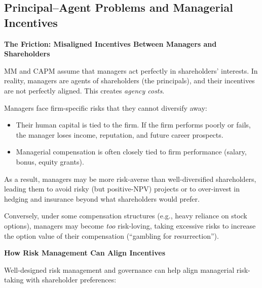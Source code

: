 \documentclass[11pt,openany]{book}
\providecommand{\tightlist}{\setlength{\itemsep}{0pt}\setlength{\parskip}{0pt}}
\begin{document}
\subsection{Principal--Agent Problems and Managerial Incentives}\label{principalagent-problems-and-managerial-incentives}

\textbf{The Friction: Misaligned Incentives Between Managers and Shareholders}

MM and CAPM assume that managers act perfectly in shareholders' interests. In reality, managers are agents of shareholders (the principals), and their incentives are not perfectly aligned. This creates \emph{agency costs}.

Managers face firm-specific risks that they cannot diversify away:

\begin{itemize}
\tightlist
\item
  Their human capital is tied to the firm. If the firm performs poorly or fails, the manager loses income, reputation, and future career prospects.
\item
  Managerial compensation is often closely tied to firm performance (salary, bonus, equity grants).
\end{itemize}

As a result, managers may be more risk-averse than well-diversified shareholders, leading them to avoid risky (but positive-NPV) projects or to over-invest in hedging and insurance beyond what shareholders would prefer.

Conversely, under some compensation structures (e.g., heavy reliance on stock options), managers may become \emph{too} risk-loving, taking excessive risks to increase the option value of their compensation (``gambling for resurrection'').

\textbf{How Risk Management Can Align Incentives}

Well-designed risk management and governance can help align managerial risk-taking with shareholder preferences:
\end{document}
